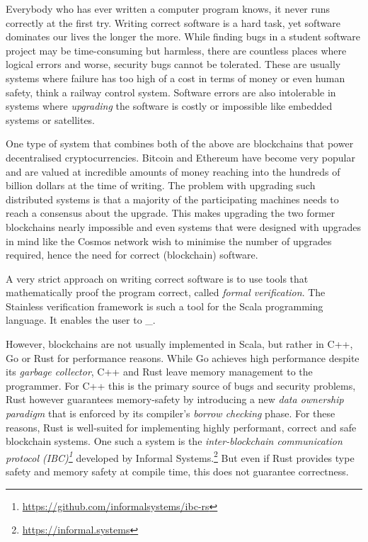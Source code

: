 Everybody who has ever written a computer program knows, it never runs
correctly at the first try. Writing correct software is a hard task, yet
software dominates our lives the longer the more. While finding bugs in
a student software project may be time-consuming but harmless, there are
countless places where logical errors and worse, security bugs cannot be
tolerated. These are usually systems where failure has too high of a
cost in terms of money or even human safety, think a railway control
system. Software errors are also intolerable in systems where
\emph{upgrading} the software is costly or impossible like embedded
systems or satellites.

One type of system that combines both of the above are blockchains that power
decentralised cryptocurrencies. Bitcoin \cite{bitcoin} and Ethereum
\cite{ethereum} have become very popular and are valued at incredible amounts of
money reaching into the hundreds of billion dollars at the time of writing. The
problem with upgrading such distributed systems is that a majority of the
participating machines needs to reach a consensus about the upgrade. This makes
upgrading the two former blockchains nearly impossible and even systems that
were designed with upgrades in mind like the Cosmos network \cite{cosmos} wish
to minimise the number of upgrades required, hence the need for correct
(blockchain) software.

A very strict approach on writing correct software is to use tools that
mathematically proof the program correct, called \emph{formal verification}. The
Stainless verification framework \cite{stainless} is such a tool for the Scala
programming language. It enables the user to \_.

However, blockchains are not usually implemented in Scala, but rather in C++, Go
or Rust for performance reasons. While Go achieves high performance despite its
\emph{garbage collector}, C++ and Rust leave memory management to the
programmer. For C++ this is the primary source of bugs and security problems,
Rust however guarantees memory-safety by introducing a new \emph{data ownership
paradigm} that is enforced by its compiler's \emph{borrow checking} phase. For
these reasons, Rust is well-suited for implementing highly performant, correct
and safe blockchain systems. One such a system is the \emph{inter-blockchain
communication protocol
(IBC)\footnote{\url{https://github.com/informalsystems/ibc-rs}}} developed by
Informal Systems.\footnote{\url{https://informal.systems}} But even if Rust
provides type safety and memory safety at compile time, this does not guarantee
correctness.

